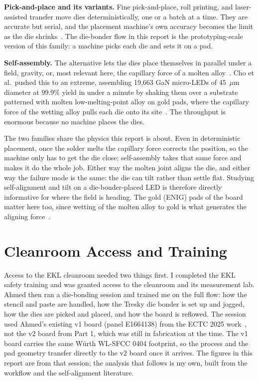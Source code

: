 \documentclass[conference]{IEEEtran}
\begin{document}
\textbf{Pick-and-place and its variants.} Fine pick-and-place, roll
printing, and laser-assisted transfer move dies deterministically, one or a
batch at a time. They are accurate but serial, and the placement machine's
own accuracy becomes the limit as the die
shrinks~\cite{ji2022selfassembly}. The die-bonder flow in this report is the
prototyping-scale version of this family: a machine picks each die and sets
it on a pad.

\textbf{Self-assembly.} The alternative lets the dies place themselves in
parallel under a field, gravity, or, most relevant here, the capillary force
of a molten alloy~\cite{ji2022selfassembly}. Cho et al.\ pushed this to an
extreme, assembling 19{,}663 GaN micro-LEDs of 45~$\mu$m diameter at 99.9\%
yield in under a minute by shaking them over a substrate patterned with
molten low-melting-point alloy on gold pads, where the capillary force of
the wetting alloy pulls each die onto its site~\cite{cho2019fsa}. The
throughput is enormous because no machine places the dies.

The two families share the physics this report is about. Even in
deterministic placement, once the solder melts the capillary force corrects
the position, so the machine only has to get the die close; self-assembly
takes that same force and makes it do the whole job. Either way the molten
joint aligns the die, and either way the failure mode is the same: the die
can tilt rather than settle flat. Studying self-alignment and tilt on a
die-bonder-placed LED is therefore directly informative for where the field
is heading. The gold (ENIG) pads of the board matter here too, since wetting
of the molten alloy to gold is what generates the aligning
force~\cite{cho2019fsa}.

\section{Cleanroom Access and Training}

Access to the EKL cleanroom needed two things first. I completed the EKL
safety training and was granted access to the cleanroom and its measurement
lab. Ahmed then ran a die-bonding session and trained me on the full flow:
how the stencil and paste are handled, how the Tresky die bonder is set up
and jogged, how the dies are picked and placed, and how the board is
reflowed. The session used Ahmed's existing v1 board (panel E1664138) from
the ECTC 2025 work~\cite{abdelwahab2025ectc}, not the v2 board from Part 1,
which was still in fabrication at the time. The v1 board carries the same
W\"urth WL-SFCC 0404 footprint, so the process and the pad geometry
transfer directly to the v2 board once it arrives. The figures in this
report are from that session; the analysis that follows is my own, built
from the workflow and the self-alignment literature.
\end{document}
